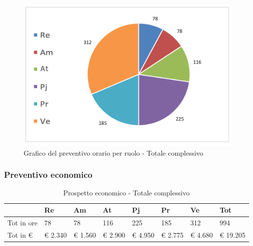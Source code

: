 			\begin{figure}[H]
			\centering
			\includegraphics[scale=0.40]{img/h_r_Totale}
			\caption{Grafico del preventivo orario per ruolo - Totale complessivo}
			\label{fig:Totale complessivo orario}
			\end{figure}
					\newpage
					\subsubsection {Preventivo economico}

								\begin{table}[H] \begin{center} \begin{tabular}{llllllll}
								\toprule
									&	\textbf{Re}	&	\textbf{Am}	&	\textbf{At}	&	\textbf{Pj}	&	\textbf{Pr}	&	\textbf{Ve}	&	\textbf{Tot}\\
								\midrule
								Tot in ore	&	78	&	78	&	116	&	225	&	185	&	312	&	994	 \\


								Tot in €	&	 €        2.340 	 & 	 €    1.560 	 & 	 €        2.900 	 & 	 €    4.950 	 & 	 €        2.775 	 & 	 €    4.680 	 & 	 €           19.205 	 \\
								\bottomrule
								\end{tabular} \end{center} \caption{Prospetto economico -
								Totale complessivo
								}\label{tab:s_TotaleComplessivo} \end{table}

